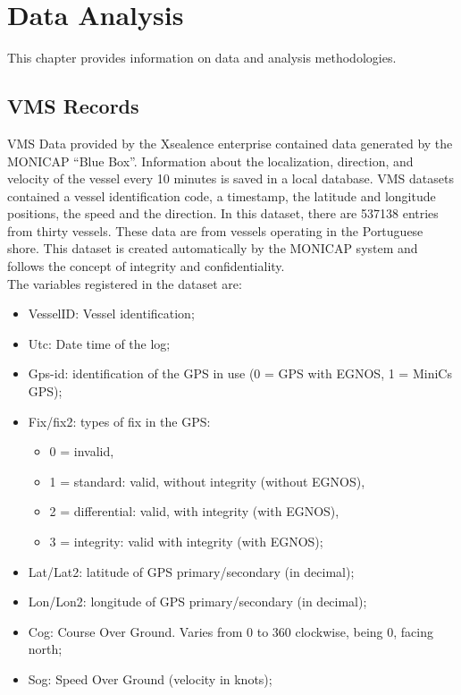 % 
%  
%
\chapter{Data Analysis}
\label{cha:data}
This chapter provides information on data and analysis methodologies.

\section{VMS Records} %
\label{sec:vms_records}

VMS Data provided by the Xsealence enterprise contained data generated by the MONICAP “Blue Box”. Information about the localization, direction, and velocity of the vessel every 10 minutes is saved in a local database. VMS datasets contained a vessel identification code, a timestamp, the latitude and longitude positions, the speed and the direction. In this dataset, there are 537138 entries from thirty vessels. These data are from vessels operating in the Portuguese shore.  
This dataset is created automatically by the MONICAP system and follows the concept of integrity and confidentiality.\\
The variables registered in the dataset are:
\begin{itemize}
\item VesselID: Vessel identification;
\item    Utc: Date time of the log;
\item    Gps-id: identification of the GPS in use (0 = GPS with EGNOS, 1 = MiniCs GPS);
\item    Fix/fix2: types of fix in the GPS:
\begin{itemize}
\item    0 = invalid, 
\item    1 = standard: valid, without integrity (without EGNOS), 
\item    2 = differential: valid, with integrity (with EGNOS), 
\item    3 = integrity: valid with integrity (with EGNOS);
\end{itemize}
\item    Lat/Lat2: latitude of GPS primary/secondary (in decimal);
\item    Lon/Lon2: longitude of GPS primary/secondary (in decimal);
\item    Cog: Course Over Ground. Varies from 0 to 360 clockwise, being 0, facing north;
\item    Sog: Speed Over Ground (velocity in knots);


\end{itemize}


